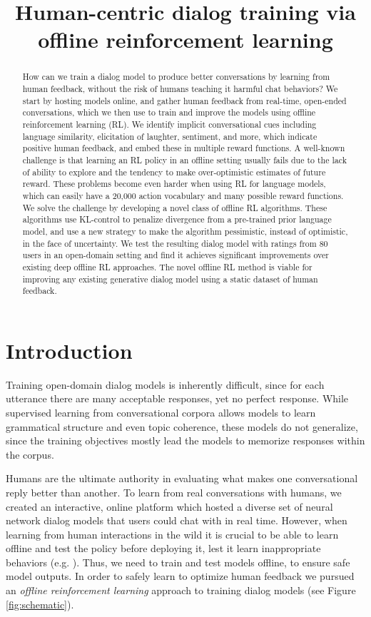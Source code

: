 \title{Human-centric dialog training via offline reinforcement learning}

\begin{abstract}
How can we train a dialog model to produce better conversations by learning from human feedback, without the risk of humans teaching it harmful chat behaviors? We start by hosting models online, and gather human feedback from real-time, open-ended conversations, which we then use to train and improve the models using offline reinforcement learning (RL). We identify implicit conversational cues including language similarity, elicitation of laughter, sentiment, and more, which indicate positive human feedback, and embed these in multiple reward functions.  A well-known challenge is that learning an RL policy in an offline setting usually fails due to the lack of ability to explore and the tendency to make over-optimistic estimates of future reward. These problems become even harder when using RL for language models, which can easily have a 20,000 action vocabulary and many possible reward functions.  We solve the challenge by developing a novel class of offline RL algorithms. These algorithms use KL-control to penalize divergence from a pre-trained prior language model, and use a new strategy to make the algorithm pessimistic, instead of optimistic, in the face of uncertainty.  We test the resulting dialog model with ratings from 80 users in an open-domain setting and find it achieves significant improvements over existing deep offline RL approaches. The novel offline RL method is viable for improving any existing generative dialog model using a static dataset of human feedback.
\end{abstract}

\section{Introduction}
Training open-domain dialog models is inherently difficult, since for each utterance there are many acceptable responses, yet no perfect response. While supervised learning from conversational corpora allows models to learn grammatical structure and even topic coherence, these models do not generalize, since the training objectives mostly lead the models to memorize responses within the corpus.

Humans are the ultimate authority in evaluating what makes one conversational reply better than another. To learn from real conversations with humans, we created an interactive, online platform which hosted a diverse set of neural network dialog models that users could chat with in real time. However, when learning from human interactions in the wild it is crucial to be able to learn offline and test the policy before deploying it, lest it learn inappropriate behaviors (e.g. \citet{tay}). Thus, we need to train and test models offline, to ensure safe model outputs. In order to safely learn to optimize human feedback we pursued an \textit{offline reinforcement learning} approach to training dialog models (see Figure \ref{fig:schematic}). 

